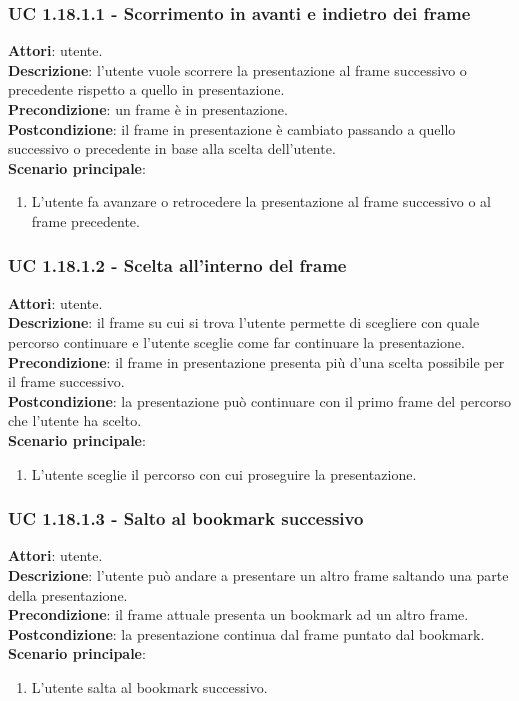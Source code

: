 	\subsubsection{UC 1.18.1.1 - Scorrimento in avanti e indietro dei frame}{
		\label{uc1.18.1.1}
		\textbf{Attori}: utente. \\
		\textbf{Descrizione}: l'utente vuole scorrere la presentazione al frame successivo o precedente rispetto a quello in presentazione. \\
		\textbf{Precondizione}: un frame è in presentazione.	\\
		\textbf{Postcondizione}: il frame in presentazione è cambiato passando a quello successivo o precedente in base alla scelta dell'utente.\\
		\textbf{Scenario principale}:
		\begin{enumerate}
			\item L'utente fa avanzare o retrocedere la presentazione al frame successivo o al frame precedente.
		\end{enumerate}
	}
	\subsubsection{UC 1.18.1.2 - Scelta all'interno del frame}{
		\label{uc1.18.1.2}
		\textbf{Attori}: utente. \\
		\textbf{Descrizione}: il frame su cui si trova l’utente permette di scegliere con quale percorso continuare e l'utente sceglie come far continuare la presentazione. \\
		\textbf{Precondizione}: il frame in presentazione presenta più d'una scelta possibile per il frame successivo.	\\
		\textbf{Postcondizione}: la presentazione può continuare con il primo frame del percorso che l'utente ha scelto.\\
		\textbf{Scenario principale}:
		\begin{enumerate}
			\item L'utente sceglie il percorso con cui proseguire la presentazione.
		\end{enumerate}
	}
	\subsubsection{UC 1.18.1.3 - Salto al bookmark successivo}{
		\label{uc1.18.1.3}
		\textbf{Attori}: utente. \\
		\textbf{Descrizione}: l'utente può andare a presentare un altro frame saltando una parte della presentazione. \\
		\textbf{Precondizione}: il frame attuale presenta un bookmark ad un altro frame.	\\
		\textbf{Postcondizione}: la presentazione continua dal frame puntato dal bookmark.	\\
		\textbf{Scenario principale}:
		\begin{enumerate}
			\item L'utente salta al bookmark successivo.
		\end{enumerate}
	}
